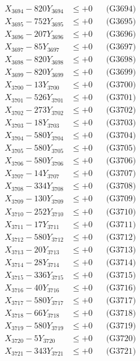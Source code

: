 \documentclass[a4paper,10pt]{article}
\begin{document}
{\begin{align}
X_{3694} - 820Y_{3694} &\leq +0 && \text{(G3694)} \\
X_{3695} - 752Y_{3695} &\leq +0 && \text{(G3695)} \\
X_{3696} - 207Y_{3696} &\leq +0 && \text{(G3696)} \\
X_{3697} - 85Y_{3697} &\leq +0 && \text{(G3697)} \\
X_{3698} - 820Y_{3698} &\leq +0 && \text{(G3698)} \\
X_{3699} - 820Y_{3699} &\leq +0 && \text{(G3699)} \\
X_{3700} - 13Y_{3700} &\leq +0 && \text{(G3700)} \\
\allowbreak
X_{3701} - 526Y_{3701} &\leq +0 && \text{(G3701)} \\
X_{3702} - 273Y_{3702} &\leq +0 && \text{(G3702)} \\
X_{3703} - 18Y_{3703} &\leq +0 && \text{(G3703)} \\
X_{3704} - 580Y_{3704} &\leq +0 && \text{(G3704)} \\
X_{3705} - 580Y_{3705} &\leq +0 && \text{(G3705)} \\
X_{3706} - 580Y_{3706} &\leq +0 && \text{(G3706)} \\
X_{3707} - 14Y_{3707} &\leq +0 && \text{(G3707)} \\
X_{3708} - 334Y_{3708} &\leq +0 && \text{(G3708)} \\
X_{3709} - 130Y_{3709} &\leq +0 && \text{(G3709)} \\
X_{3710} - 252Y_{3710} &\leq +0 && \text{(G3710)} \\
\allowbreak
X_{3711} - 17Y_{3711} &\leq +0 && \text{(G3711)} \\
X_{3712} - 580Y_{3712} &\leq +0 && \text{(G3712)} \\
X_{3713} - 20Y_{3713} &\leq +0 && \text{(G3713)} \\
X_{3714} - 28Y_{3714} &\leq +0 && \text{(G3714)} \\
X_{3715} - 336Y_{3715} &\leq +0 && \text{(G3715)} \\
X_{3716} - 40Y_{3716} &\leq +0 && \text{(G3716)} \\
X_{3717} - 580Y_{3717} &\leq +0 && \text{(G3717)} \\
X_{3718} - 66Y_{3718} &\leq +0 && \text{(G3718)} \\
X_{3719} - 580Y_{3719} &\leq +0 && \text{(G3719)} \\
X_{3720} - 5Y_{3720} &\leq +0 && \text{(G3720)} \\
\allowbreak
X_{3721} - 343Y_{3721} &\leq +0 && \text{(G3721)} \\

\end{align}}
\end{document}
